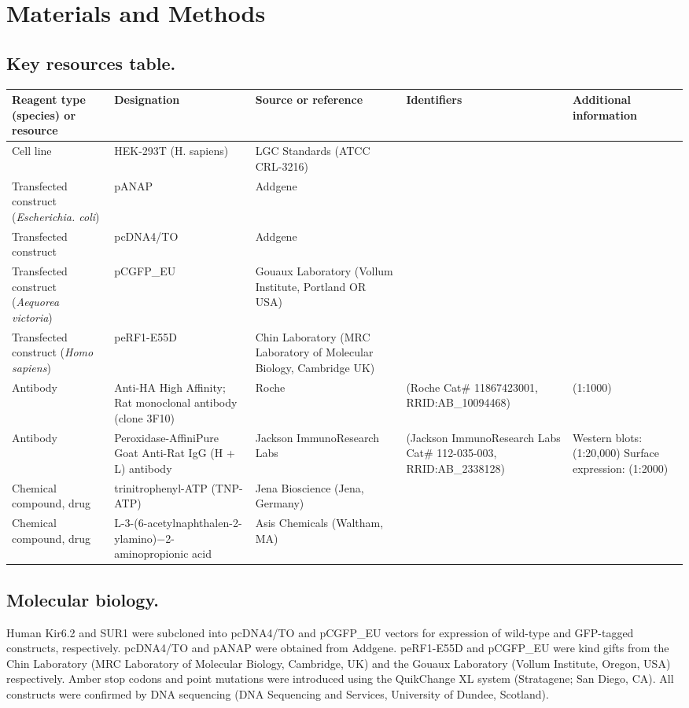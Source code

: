 \documentclass[10pt,lineno, doublespacing]{elife}
\begin{document}
\section{Materials and Methods}

\subsection{Key resources table.}
\begin{fullwidth}
\begin{tabular}{p{40mm} | p{35mm} | p{35mm} | p{35mm} | p{25mm}}
\toprule
Reagent type (species) or resource & Designation & Source or reference & Identifiers & Additional information \\
\midrule
Cell line & HEK-293T (H. sapiens) & LGC Standards (ATCC CRL-3216) && \\
Transfected construct (\textit{Escherichia. coli}) & pANAP & Addgene && \\
Transfected construct & pcDNA4/TO & Addgene && \\
Transfected construct (\textit{Aequorea victoria}) & pCGFP\_EU & Gouaux Laboratory (Vollum Institute, Portland OR USA) && \\
Transfected construct (\textit{Homo sapiens}) & peRF1-E55D & Chin Laboratory (MRC Laboratory of Molecular Biology, Cambridge UK) && \\
Antibody & Anti-HA High Affinity; Rat monoclonal antibody (clone 3F10) & Roche & (Roche Cat\# 11867423001, RRID:AB\_10094468) & (1:1000)\\
Antibody & Peroxidase-AffiniPure Goat Anti-Rat IgG (H + L) antibody & Jackson ImmunoResearch Labs & (Jackson ImmunoResearch Labs Cat\# 112-035-003, RRID:AB\_2338128) & Western blots: (1:20,000) Surface expression: (1:2000)\\
Chemical compound, drug & trinitrophenyl-ATP (TNP-ATP) & Jena Bioscience (Jena, Germany) && \\
Chemical compound, drug & L-3-(6-acetylnaphthalen-2-ylamino)−2-aminopropionic acid & Asis Chemicals (Waltham, MA) && \\
\midrule
\end{tabular}
\end{fullwidth}

\subsection{Molecular biology.}
Human Kir6.2 and SUR1 were subcloned into pcDNA4/TO and pCGFP\_EU vectors for expression of wild-type and GFP-tagged constructs, respectively.
pcDNA4/TO and pANAP were obtained from Addgene.
peRF1-E55D and pCGFP\_EU were kind gifts from the Chin Laboratory (MRC Laboratory of Molecular Biology, Cambridge, UK) and the Gouaux Laboratory (Vollum Institute, Oregon, USA) respectively.
Amber stop codons and point mutations were introduced using the QuikChange XL system (Stratagene; San Diego, CA).
All constructs were confirmed by DNA sequencing (DNA Sequencing and Services, University of Dundee, Scotland).
\end{document}
